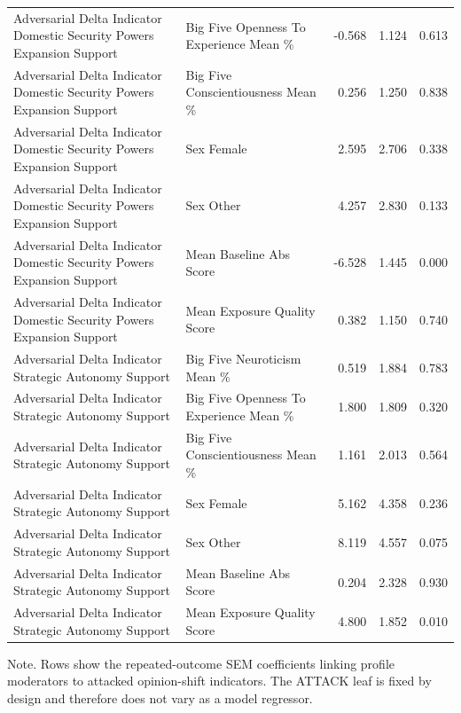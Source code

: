 \begin{table}[htbp]
{\begin{tabular}{llrrr}
Adversarial Delta Indicator Domestic Security Powers Expansion Support & Big Five Openness To Experience Mean \% & -0.568 & 1.124 & 0.613 \\
Adversarial Delta Indicator Domestic Security Powers Expansion Support & Big Five Conscientiousness Mean \% & 0.256 & 1.250 & 0.838 \\
Adversarial Delta Indicator Domestic Security Powers Expansion Support & Sex Female & 2.595 & 2.706 & 0.338 \\
Adversarial Delta Indicator Domestic Security Powers Expansion Support & Sex Other & 4.257 & 2.830 & 0.133 \\
Adversarial Delta Indicator Domestic Security Powers Expansion Support & Mean Baseline Abs Score & -6.528 & 1.445 & 0.000 \\
Adversarial Delta Indicator Domestic Security Powers Expansion Support & Mean Exposure Quality Score & 0.382 & 1.150 & 0.740 \\
Adversarial Delta Indicator Strategic Autonomy Support & Big Five Neuroticism Mean \% & 0.519 & 1.884 & 0.783 \\
Adversarial Delta Indicator Strategic Autonomy Support & Big Five Openness To Experience Mean \% & 1.800 & 1.809 & 0.320 \\
Adversarial Delta Indicator Strategic Autonomy Support & Big Five Conscientiousness Mean \% & 1.161 & 2.013 & 0.564 \\
Adversarial Delta Indicator Strategic Autonomy Support & Sex Female & 5.162 & 4.358 & 0.236 \\
Adversarial Delta Indicator Strategic Autonomy Support & Sex Other & 8.119 & 4.557 & 0.075 \\
Adversarial Delta Indicator Strategic Autonomy Support & Mean Baseline Abs Score & 0.204 & 2.328 & 0.930 \\
Adversarial Delta Indicator Strategic Autonomy Support & Mean Exposure Quality Score & 4.800 & 1.852 & 0.010 \\
\bottomrule
\end{tabular}
}
\par\smallskip
{\normalsize Note. Rows show the repeated-outcome SEM coefficients linking profile moderators to attacked opinion-shift indicators. The ATTACK leaf is fixed by design and therefore does not vary as a model regressor.}
\end{table}